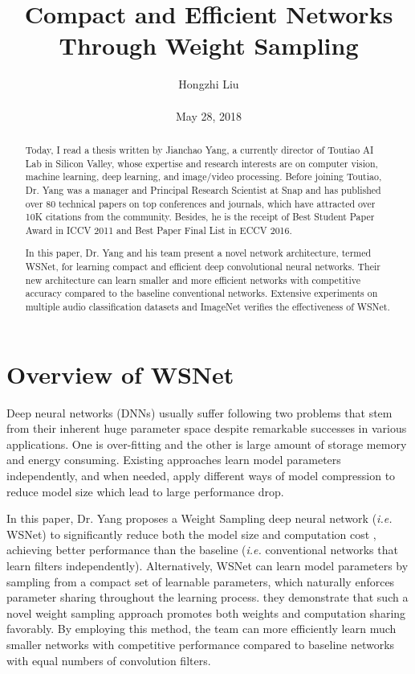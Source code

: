 \documentclass[10pt,twocolumn,letterpaper]{article}
\title{Compact and Efficient Networks Through Weight Sampling}
\author{Hongzhi Liu\\\\
May 28, 2018}
\begin{document}
\maketitle
\begin{abstract}
	Today, I read a thesis written by Jianchao Yang, a currently director of Toutiao AI Lab in Silicon Valley, whose expertise and research interests are on computer vision, machine learning, deep learning, and image/video processing. Before joining Toutiao, Dr. Yang was a manager and Principal Research Scientist at Snap and has published over 80 technical papers on top conferences and journals, which have attracted over 10K citations from the community. Besides, he is the receipt of Best Student Paper Award in ICCV 2011 and Best Paper Final List in ECCV 2016.
	
	In this paper, Dr. Yang and his team present a novel network architecture, termed WSNet, for learning compact and efficient deep convolutional neural networks. Their new architecture can learn smaller and more efficient networks with competitive accuracy compared to the baseline conventional networks. Extensive experiments on multiple audio classification datasets and ImageNet verifies the effectiveness of WSNet. 
\end{abstract}
\section{Overview of WSNet}

Deep neural networks (DNNs) usually suffer following two problems that stem from their inherent huge parameter space despite remarkable successes in various applications. One is over-fitting and the other is large amount of storage memory and energy consuming. Existing approaches learn model parameters independently, and when needed, apply different ways of model compression to reduce model size which lead to large performance drop.

In this paper, Dr. Yang proposes a Weight Sampling deep neural network (\emph{i.e.} WSNet) to significantly reduce both the model size and computation cost \cite{DBLP}, achieving better performance than the baseline (\emph{i.e.} conventional networks that learn filters independently). Alternatively, WSNet can learn model parameters by sampling from a compact set of learnable parameters, which naturally enforces parameter sharing throughout the learning process. they demonstrate that such a novel weight sampling approach promotes both weights and computation sharing favorably. By employing this method, the team can more efficiently learn much smaller networks with competitive performance compared to baseline networks with equal numbers of convolution filters.
\end{document}
